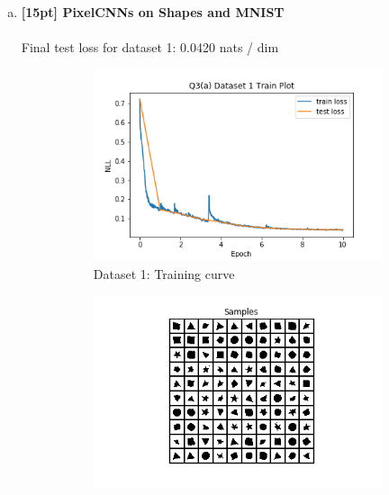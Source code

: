 \documentclass{article}
\begin{document}
\newpage
{}

\begin{enumerate}[(a)]
\item {\bf [15pt] PixelCNNs on Shapes and MNIST} \\\\
Final test loss for dataset 1: 0.0420  nats / dim
\begin{figure}[H]
    \centering
    \begin{subfigure}{0.45\textwidth}
        \centering
        \includegraphics[width=\textwidth]{figures/q3_a_dset1_train_plot.png}
        \caption{Dataset 1: Training curve}
    \end{subfigure}
    \hspace{0.2in}
    \begin{subfigure}{0.45\textwidth}
        \centering
        \includegraphics[width=\textwidth]{figures/q3_a_dset1_samples.png}

\end{subfigure}
\end{figure}
\end{enumerate}
\end{document}
